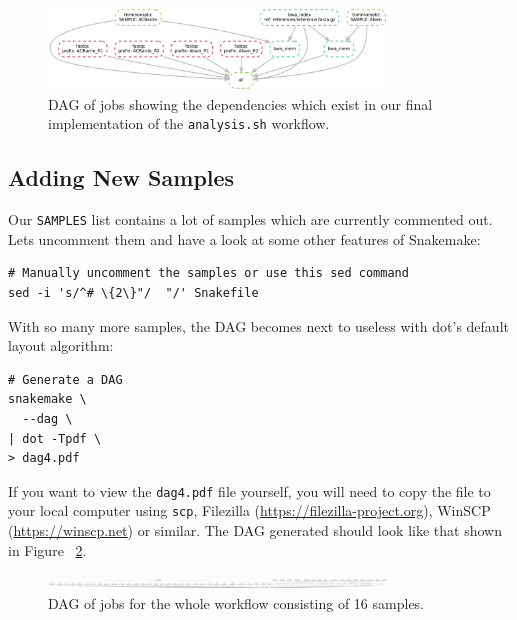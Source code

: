 \begin{figure}[H]
\centering
\includegraphics[width=0.8\textwidth]{handout/dag3.pdf}
\caption{DAG of jobs showing the dependencies which exist in our final implementation of the \texttt{analysis.sh} workflow.}
\label{fig:dag3}
\end{figure}

\subsection{Adding New Samples}

Our \texttt{SAMPLES} list contains a lot of samples which are currently commented out. Lets uncomment them and have a look
at some other features of Snakemake:

\begin{lstlisting}
# Manually uncomment the samples or use this sed command
sed -i 's/^# \{2\}"/  "/' Snakefile
\end{lstlisting}

With so many more samples, the DAG becomes next to useless with dot's default layout algorithm:

\begin{lstlisting}
# Generate a DAG
snakemake \
  --dag \
| dot -Tpdf \
> dag4.pdf
\end{lstlisting}

\begin{warning}

If you want to view the \texttt{dag4.pdf} file yourself, you will need to copy the file to your local computer using \texttt{scp},
Filezilla (\url{https://filezilla-project.org}), WinSCP (\url{https://winscp.net}) or similar. The DAG generated should look like
that shown in Figure ~\ref{fig:dag4}.

\end{warning}

\begin{figure}[H]
\centering
\includegraphics[width=0.8\textwidth]{handout/dag4.pdf}
\caption{DAG of jobs for the whole workflow consisting of 16 samples.}
\label{fig:dag4}
\end{figure}


